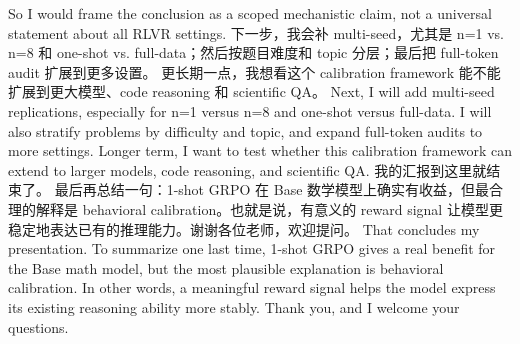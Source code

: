 {}So I would frame the conclusion as a scoped mechanistic claim, not a universal statement about all RLVR settings.\markdownRendererInterblockSeparator
{}\markdownRendererHorizontalRule{}\markdownRendererInterblockSeparator
{}\markdownRendererInterblockSeparator
{}\markdownRendererInterblockSeparator
{}下一步，我会补 multi-seed，尤其是 n=1 vs. n=8 和 one-shot vs. full-data；然后按题目难度和 topic 分层；最后把 full-token audit 扩展到更多设置。\markdownRendererInterblockSeparator
{}更长期一点，我想看这个 calibration framework 能不能扩展到更大模型、code reasoning 和 scientific QA。\markdownRendererInterblockSeparator
{}\markdownRendererInterblockSeparator
{}Next, I will add multi-seed replications, especially for n=1 versus n=8 and one-shot versus full-data. I will also stratify problems by difficulty and topic, and expand full-token audits to more settings.\markdownRendererInterblockSeparator
{}Longer term, I want to test whether this calibration framework can extend to larger models, code reasoning, and scientific QA.\markdownRendererInterblockSeparator
{}\markdownRendererHorizontalRule{}\markdownRendererInterblockSeparator
{}\markdownRendererInterblockSeparator
{}\markdownRendererInterblockSeparator
{}我的汇报到这里就结束了。\markdownRendererInterblockSeparator
{}最后再总结一句：1-shot GRPO 在 Base 数学模型上确实有收益，但最合理的解释是 behavioral calibration。也就是说，有意义的 reward signal 让模型更稳定地表达已有的推理能力。谢谢各位老师，欢迎提问。\markdownRendererInterblockSeparator
{}\markdownRendererInterblockSeparator
{}That concludes my presentation.\markdownRendererInterblockSeparator
{}To summarize one last time, 1-shot GRPO gives a real benefit for the Base math model, but the most plausible explanation is behavioral calibration. In other words, a meaningful reward signal helps the model express its existing reasoning ability more stably. Thank you, and I welcome your questions.\markdownRendererInterblockSeparator
{}\markdownRendererHorizontalRule{}\markdownRendererInterblockSeparator
{}\markdownRendererInterblockSeparator
{}\markdownRendererInterblockSeparator

